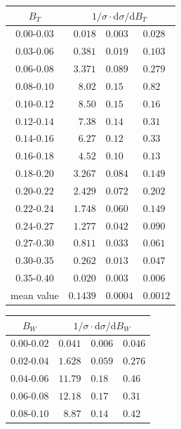 \documentclass[12pt,a4paper,twoside]{article}
\begin{document}
\begin{table}[!htb]
\begin{center}
\vspace*{5mm}
%
%
\begin{tabular}{|c||r@{ $\pm$ }l@{ $\pm$ }l|}   
\hline
$B_T$           & 
      \multicolumn{3}{c|}{$1/\sigma \cdot {\mathrm{d}}\sigma/{\mathrm{d}}B_T$} \\
\hline\hline
$ 0.00 $-$0.03  $&$  0.018 $&$  0.003 $&$  0.028 $\\
$ 0.03 $-$0.06  $&$  0.381 $&$  0.019 $&$  0.103 $\\
$ 0.06 $-$0.08  $&$  3.371 $&$  0.089 $&$  0.279 $\\
$ 0.08 $-$0.10  $&$  8.02  $&$  0.15  $&$  0.82  $\\
$ 0.10 $-$0.12  $&$  8.50  $&$  0.15  $&$  0.16  $\\
$ 0.12 $-$0.14  $&$  7.38  $&$  0.14  $&$  0.31  $\\
$ 0.14 $-$0.16  $&$  6.27  $&$  0.12  $&$  0.33  $\\
$ 0.16 $-$0.18  $&$  4.52  $&$  0.10  $&$  0.13  $\\
$ 0.18 $-$0.20  $&$  3.267 $&$  0.084 $&$  0.149 $\\
$ 0.20 $-$0.22  $&$  2.429 $&$  0.072 $&$  0.202 $\\
$ 0.22 $-$0.24  $&$  1.748 $&$  0.060 $&$  0.149 $\\
$ 0.24 $-$0.27  $&$  1.277 $&$  0.042 $&$  0.090 $\\
$ 0.27 $-$0.30  $&$  0.811 $&$  0.033 $&$  0.061 $\\
$ 0.30 $-$0.35  $&$  0.262 $&$  0.013 $&$  0.047 $\\
$ 0.35 $-$0.40  $&$  0.020 $&$  0.003 $&$  0.006 $\\
\hline\hline
mean value       &$  0.1439 $&$ 0.0004 $&$ 0.0012 $\\
\hline
\end{tabular}
%
%
\begin{tabular}{|c||r@{ $\pm$ }l@{ $\pm$ }l|}   
\hline
$B_W$           & 
      \multicolumn{3}{c|}{$1/\sigma \cdot {\mathrm{d}}\sigma/{\mathrm{d}}B_W$} \\
\hline\hline
$ 0.00 $-$0.02  $&$  0.041 $&$  0.006 $&$  0.046 $\\
$ 0.02 $-$0.04  $&$  1.628 $&$  0.059 $&$  0.276 $\\
$ 0.04 $-$0.06  $&$ 11.79  $&$  0.18  $&$  0.46  $\\
$ 0.06 $-$0.08  $&$ 12.18  $&$  0.17  $&$  0.31  $\\
$ 0.08 $-$0.10  $&$  8.87  $&$  0.14  $&$  0.42  $\\

\end{tabular}
\end{center}
\end{table}
\end{document}
